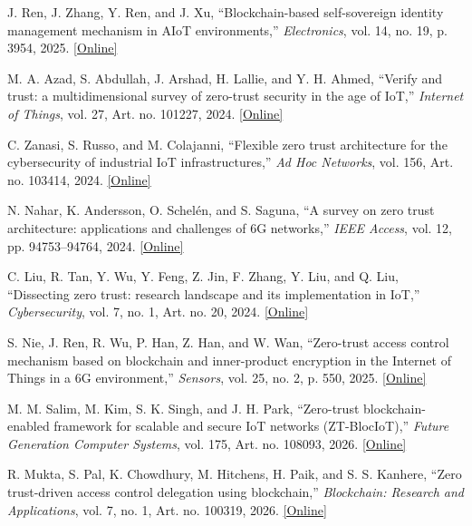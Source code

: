 J. Ren, J. Zhang, Y. Ren, and J. Xu, ``Blockchain-based self-sovereign identity management mechanism in AIoT environments,'' \emph{Electronics}, vol. 14, no. 19, p. 3954, 2025. \href{https://doi.org/10.3390/electronics14193954}{[Online]}

M. A. Azad, S. Abdullah, J. Arshad, H. Lallie, and Y. H. Ahmed, ``Verify and trust: a multidimensional survey of zero-trust security in the age of IoT,'' \emph{Internet of Things}, vol. 27, Art. no. 101227, 2024. \href{https://doi.org/10.1016/j.iot.2024.101227}{[Online]}

C. Zanasi, S. Russo, and M. Colajanni, ``Flexible zero trust architecture for the cybersecurity of industrial IoT infrastructures,'' \emph{Ad Hoc Networks}, vol. 156, Art. no. 103414, 2024. \href{https://doi.org/10.1016/j.adhoc.2024.103414}{[Online]}

N. Nahar, K. Andersson, O. Schel\'en, and S. Saguna, ``A survey on zero trust architecture: applications and challenges of 6G networks,'' \emph{IEEE Access}, vol. 12, pp. 94753--94764, 2024. \href{https://doi.org/10.1109/ACCESS.2024.3425350}{[Online]}

C. Liu, R. Tan, Y. Wu, Y. Feng, Z. Jin, F. Zhang, Y. Liu, and Q. Liu, ``Dissecting zero trust: research landscape and its implementation in IoT,'' \emph{Cybersecurity}, vol. 7, no. 1, Art. no. 20, 2024. \href{https://doi.org/10.1186/s42400-024-00212-0}{[Online]}

S. Nie, J. Ren, R. Wu, P. Han, Z. Han, and W. Wan, ``Zero-trust access control mechanism based on blockchain and inner-product encryption in the Internet of Things in a 6G environment,'' \emph{Sensors}, vol. 25, no. 2, p. 550, 2025. \href{https://doi.org/10.3390/s25020550}{[Online]}

M. M. Salim, M. Kim, S. K. Singh, and J. H. Park, ``Zero-trust blockchain-enabled framework for scalable and secure IoT networks (ZT-BlocIoT),'' \emph{Future Generation Computer Systems}, vol. 175, Art. no. 108093, 2026. \href{https://doi.org/10.1016/j.future.2025.108093}{[Online]}

R. Mukta, S. Pal, K. Chowdhury, M. Hitchens, H. Paik, and S. S. Kanhere, ``Zero trust-driven access control delegation using blockchain,'' \emph{Blockchain: Research and Applications}, vol. 7, no. 1, Art. no. 100319, 2026. \href{https://doi.org/10.1016/j.bcra.2025.100319}{[Online]}

